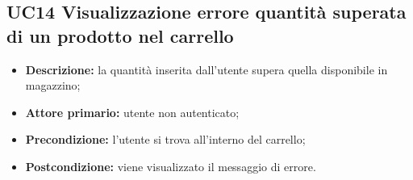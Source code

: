 \subsection{UC14 Visualizzazione errore quantità superata di un prodotto nel carrello}
\label{sec:UC14}
\begin{itemize}
    \item \textbf{Descrizione:} la quantità inserita dall'utente supera quella disponibile in magazzino;
    \item \textbf{Attore primario:} utente non autenticato;
    \item \textbf{Precondizione:} l'utente si trova all'interno del carrello;
    \item \textbf{Postcondizione:} viene visualizzato il messaggio di errore.
\end{itemize}